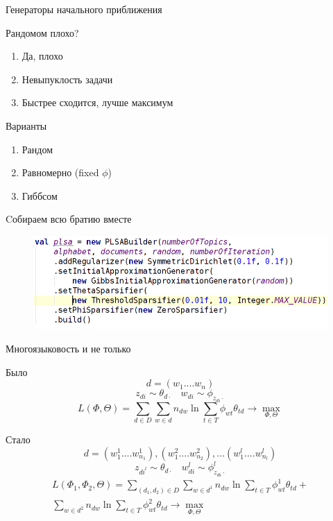\documentclass{beamer}
\begin{document}
\begin{frame}{ Генераторы начального приближения}
    \begin{block}{Рандомом плохо?}
	\begin{enumerate}
	    \item Да, плохо
	    \item Невыпуклость задачи
	    \item Быстрее сходится, лучше максимум
	\end{enumerate}
    \end{block}

    \begin{block}{Варианты}
	\begin{enumerate}
	    \item Рандом
	    \item Равномерно (fixed $\phi$)
	    \item Гиббсом
	\end{enumerate}
    \end{block}
\end{frame}


\begin{frame}{Cобираем всю братию вместе}
    \begin{figure}[ht!]
	\centering
	\includegraphics[width=115mm]{builderConfugration.png}
	\label{overflow}
    \end{figure}
\end{frame}



\begin{frame}{Многоязыковость и не только}
    \begin{block}{Было}
	$$d = (w_1 .... w_n )$$
	$$z_{di} \sim \theta_{d \cdot} ~~~~ w_{di} \sim \phi_{z_{di} \cdot }$$
	$$L(\Phi, \Theta) = \sum\limits_{d \in D} \sum\limits_{w \in d}
	    n_{dw} \ln \sum\limits_{t \in T} \phi_{wt}\theta_{td} \rightarrow \max\limits_{\Phi, \Theta}$$
    \end{block}

    \begin{block}{Стало}
	$$d = (w^1_1 .... w^1_{n_1} ), (w^2_1 .... w^2_{n_2} ) , ... (w^l_1 .... w^l_{n_l} ) $$
	$$z_{di^l} \sim \theta_{d \cdot} ~~~~ w_{di}^l \sim \phi_{z_{di} \cdot }^l$$
	\begin{equation*}
	    \begin{split}
		L(\Phi_1, \Phi_2, \Theta) = \sum\limits_{(d_1,d_2) \in D}  \sum\limits_{w \in d^1}
			n_{dw} \ln \sum\limits_{t \in T} \phi^1_{wt}\theta_{td} + \\
			\sum\limits_{w \in d^2}
			n_{dw} \ln \sum\limits_{t \in T} \phi^2_{wt}\theta_{td}  \rightarrow \max\limits_{\Phi, \Theta}
	    \end{split}
	\end{equation*}
    \end{block}
\end{frame}
\end{document}

